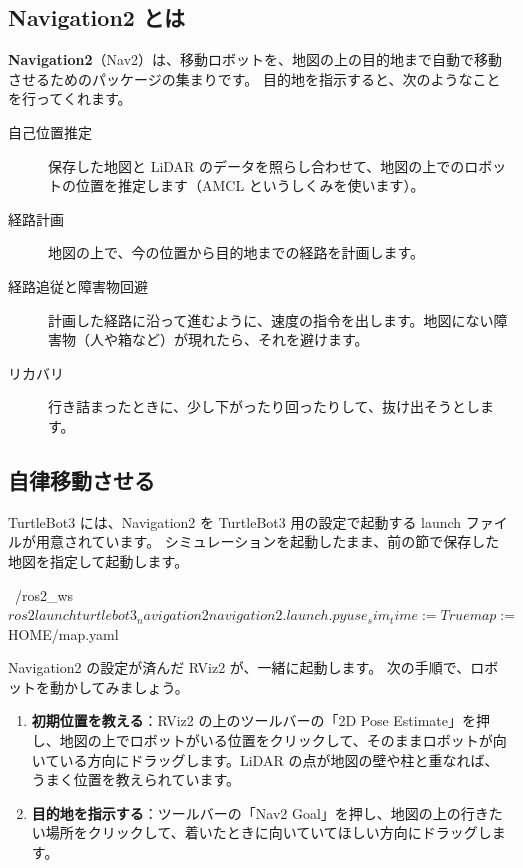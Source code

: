 \subsection{Navigation2 とは}

\textbf{Navigation2}（Nav2）は、移動ロボットを、地図の上の目的地まで自動で移動させるためのパッケージの集まりです。
目的地を指示すると、次のようなことを行ってくれます。

\begin{description}
  \item[自己位置推定] 保存した地図と LiDAR のデータを照らし合わせて、地図の上でのロボットの位置を推定します（AMCL というしくみを使います）。
  \item[経路計画] 地図の上で、今の位置から目的地までの経路を計画します。
  \item[経路追従と障害物回避] 計画した経路に沿って進むように、速度の指令を出します。地図にない障害物（人や箱など）が現れたら、それを避けます。
  \item[リカバリ] 行き詰まったときに、少し下がったり回ったりして、抜け出そうとします。
\end{description}

\subsection{自律移動させる}

TurtleBot3 には、Navigation2 を TurtleBot3 用の設定で起動する launch ファイルが用意されています。
シミュレーションを起動したまま、前の節で保存した地図を指定して起動します。

\begin{terminal}
~/ros2_ws$ ros2 launch turtlebot3_navigation2 navigation2.launch.py use_sim_time:=True map:=$HOME/map.yaml
\end{terminal}

Navigation2 の設定が済んだ RViz2 が、一緒に起動します。
次の手順で、ロボットを動かしてみましょう。

\begin{enumerate}
  \item \textbf{初期位置を教える}：RViz2 の上のツールバーの「2D Pose Estimate」を押し、地図の上でロボットがいる位置をクリックして、そのままロボットが向いている方向にドラッグします。LiDAR の点が地図の壁や柱と重なれば、うまく位置を教えられています。
  \item \textbf{目的地を指示する}：ツールバーの「Nav2 Goal」を押し、地図の上の行きたい場所をクリックして、着いたときに向いていてほしい方向にドラッグします。
\end{enumerate}

